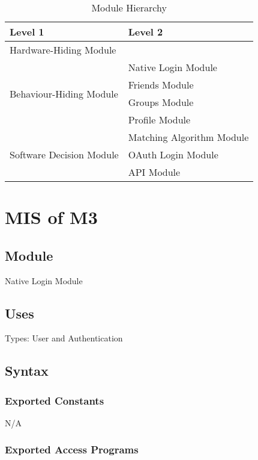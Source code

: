 \documentclass[12pt, titlepage]{article}
\begin{document}
\begin{table}[h!]
	\centering
	\begin{tabular}{p{} p{}}
		\toprule
		\textbf{Level 1} & \textbf{Level 2}\\
		\midrule
		
		{Hardware-Hiding Module} & ~ \\
		\midrule
		
		\multirow{4}{0.3\textwidth}{Behaviour-Hiding Module} & {Native Login Module}\\
		& Friends Module\\
		& Groups Module\\
		& Profile Module\\
		\midrule
		
		\multirow{3}{0.3\textwidth}{Software Decision Module} & {Matching Algorithm Module}\\
		& OAuth Login Module\\
		& API Module\\
		\bottomrule
		
	\end{tabular}
	\caption{Module Hierarchy}
	\label{TblMH}
\end{table}

\newpage


\section{MIS of M3} \label{Module}

\subsection{Module}
Native Login Module

\subsection{Uses}
Types: User and Authentication

\subsection{Syntax}

\subsubsection{Exported Constants}
N/A

\subsubsection{Exported Access Programs}
\end{document}
